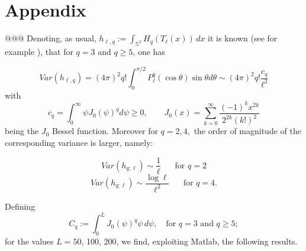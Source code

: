 \documentclass[aps,prd,showpacs,superscriptaddress,groupedaddress]{revtex4-1}  %
\begin{document}

\section{Appendix}
@@@
Denoting, as usual, $h_{\ell,q} :=\int_{\mathbb{S}^2} H_q(T_\ell(x)) \,dx$
it is known (see for example \cite{M e W 2012}), that for $q=3$ and $q\geq 5$, one has

$$Var(h_{\ell,q})=(4\pi)^2 q! \int_{0}^{\pi/2} P_\ell^q(\cos \theta )\sin \theta d\theta \sim (4\pi)^2 q! \frac{c_q}{\ell^2} $$
with
\begin{equation}\label{J0}
c_q=\int_{0}^{\infty} \psi J_0(\psi)^q d\psi \geq 0, \mbox{ } \mbox{ }\mbox{ } J_0(x)=\sum_{k=0}^{\infty} \dfrac{(-1)^kx^{2k}}{2^{2k}(k!)^2}
\end{equation} being the $J_0$ Bessel function. Moreover for $q=2,4,$ the order of magnitude of the corresponding variance is larger, namely: 

$$Var(h_{q;\ell}) \sim \frac{1}{\ell} \mbox{  }\mbox{  }\mbox{ for } q=2$$
$$Var(h_{q;\ell}) \sim \frac{\log \ell}{\ell^2}\mbox{  }\mbox{  } \mbox{ for } q=4.$$



Defining $$C_q:=  \int_{0}^{L} J_0(\psi)^q \psi \,d\psi, \mbox{  } \mbox{ for } q=3 \mbox{ and }q\geq 5;$$
for the values $L=50$, 100, 200, we find, exploiting Matlab, the following results.\\
\end{document}
